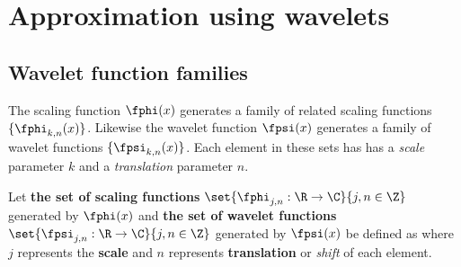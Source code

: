 \section{Approximation using wavelets}
\subsection {Wavelet function families}
The scaling function $\fphi(x)$ generates a family
of related scaling functions $\{\fphi_{k,n}(x)\}$.
Likewise the wavelet function $\fpsi(x)$ generates a family
of wavelet functions $\{\fpsi_{k,n}(x)\}$.
Each element in these sets has
has a {\em scale} parameter $k$ and a {\em translation} parameter $n$.

\begin{definition}
\label{def:phi_family}
\label{def:psi_family}
Let {\bf the set of scaling functions}
$\set{\fphi_{j,n}:\R\to\C}{j,n\in\Z}$ generated by $\fphi(x)$ and
{\bf the set of wavelet functions}
$\set{\fpsi_{j,n}:\R\to\C}{j,n\in\Z}$ generated by $\fpsi(x)$
be defined as
where $j$ represents the {\bf scale}
and $n$ represents {\bf translation} or {\em shift} of each element.
\end{definition}



